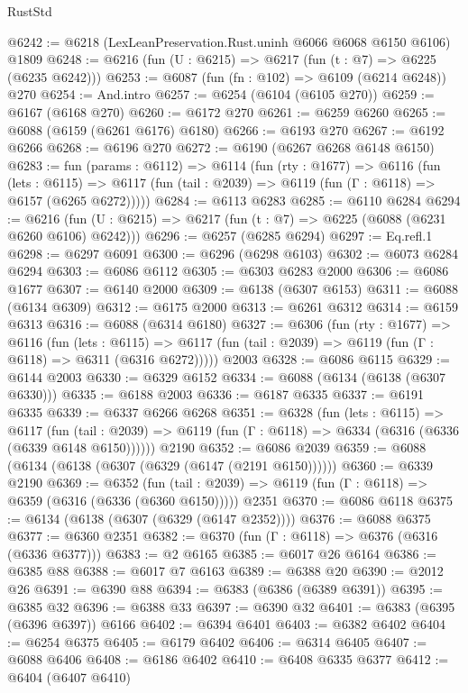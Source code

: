 \begin{lexlean}{RustStd}
\begin{coremodule}
@6242 := @6218 (LexLeanPreservation.Rust.uninh @6066 @6068 @6150 @6106) @1809
@6248 := @6216 (fun (U : @6215) => @6217 (fun (t : @7) => @6225 (@6235 @6242)))
@6253 := @6087 (fun (fn : @102) => @6109 (@6214 @6248)) @270
@6254 := And.intro
@6257 := @6254 (@6104 (@6105 @270))
@6259 := @6167 (@6168 @270)
@6260 := @6172 @270
@6261 := @6259 @6260
@6265 := @6088 (@6159 (@6261 @6176) @6180)
@6266 := @6193 @270
@6267 := @6192 @6266
@6268 := @6196 @270
@6272 := @6190 (@6267 @6268 @6148 @6150)
@6283 := fun (params : @6112) =>
  @6114
    (fun (rty : @1677) =>
    @6116
      (fun (lets : @6115) =>
      @6117 (fun (tail : @2039) => @6119 (fun (Γ : @6118) => @6157 (@6265 @6272)))))
@6284 := @6113 @6283
@6285 := @6110 @6284
@6294 := @6216 (fun (U : @6215) => @6217 (fun (t : @7) => @6225 (@6088 (@6231 @6260 @6106) @6242)))
@6296 := @6257 (@6285 @6294)
@6297 := Eq.refl.{1}
@6298 := @6297 @6091
@6300 := @6296 (@6298 @6103)
@6302 := @6073 @6284 @6294
@6303 := @6086 @6112
@6305 := @6303 @6283 @2000
@6306 := @6086 @1677
@6307 := @6140 @2000
@6309 := @6138 (@6307 @6153)
@6311 := @6088 (@6134 @6309)
@6312 := @6175 @2000
@6313 := @6261 @6312
@6314 := @6159 @6313
@6316 := @6088 (@6314 @6180)
@6327 := @6306
    (fun (rty : @1677) =>
    @6116
      (fun (lets : @6115) =>
      @6117 (fun (tail : @2039) => @6119 (fun (Γ : @6118) => @6311 (@6316 @6272)))))
    @2003
@6328 := @6086 @6115
@6329 := @6144 @2003
@6330 := @6329 @6152
@6334 := @6088 (@6134 (@6138 (@6307 @6330)))
@6335 := @6188 @2003
@6336 := @6187 @6335
@6337 := @6191 @6335
@6339 := @6337 @6266 @6268
@6351 := @6328
    (fun (lets : @6115) =>
    @6117
      (fun (tail : @2039) => @6119 (fun (Γ : @6118) => @6334 (@6316 (@6336 (@6339 @6148 @6150))))))
    @2190
@6352 := @6086 @2039
@6359 := @6088 (@6134 (@6138 (@6307 (@6329 (@6147 (@2191 @6150))))))
@6360 := @6339 @2190
@6369 := @6352
    (fun (tail : @2039) => @6119 (fun (Γ : @6118) => @6359 (@6316 (@6336 (@6360 @6150)))))
    @2351
@6370 := @6086 @6118
@6375 := @6134 (@6138 (@6307 (@6329 (@6147 @2352))))
@6376 := @6088 @6375
@6377 := @6360 @2351
@6382 := @6370 (fun (Γ : @6118) => @6376 (@6316 (@6336 @6377)))
@6383 := @2 @6165
@6385 := @6017 @26 @6164
@6386 := @6385 @88
@6388 := @6017 @7 @6163
@6389 := @6388 @20
@6390 := @2012 @26
@6391 := @6390 @88
@6394 := @6383 (@6386 (@6389 @6391))
@6395 := @6385 @32
@6396 := @6388 @33
@6397 := @6390 @32
@6401 := @6383 (@6395 (@6396 @6397)) @6166
@6402 := @6394 @6401
@6403 := @6382 @6402
@6404 := @6254 @6375
@6405 := @6179 @6402
@6406 := @6314 @6405
@6407 := @6088 @6406
@6408 := @6186 @6402
@6410 := @6408 @6335 @6377
@6412 := @6404 (@6407 @6410)

\end{coremodule}
\end{lexlean}
